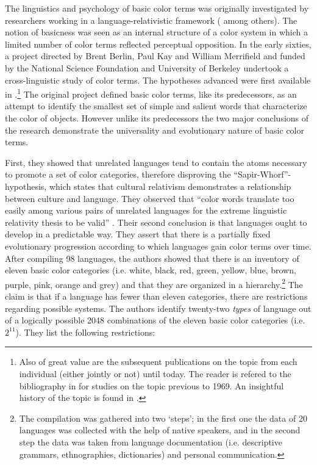 The linguistics and psychology of basic color terms was originally investigated
by researchers working in a  language-relativistic framework (\cite{Brow54,
Conk55}
among others). The notion of basicness was seen as an internal structure of a
color system in which a limited number of color terms reflected perceptual
opposition. In the early sixties, a project directed by Brent Berlin, Paul Kay
and William Merrifield and funded by the National Science Foundation and
University
of Berkeley undertook a cross-linguistic study of color terms. The
hypotheses advanced were first available in \cite{Berl69}.\footnote{Also of
great value are the subsequent publications on the topic  from each individual
(either jointly or not) until today. The reader is refered to the bibliography
in
\cite{Berl69} for studies on the topic previous to 1969.  An insightful
history of the topic is found  in
\cite{Saun00}.} The original project
 defined basic color terms, like its predecessors, as an attempt to identify the
smallest set
of simple and salient words that characterize the color of objects. However unlike its predecessors  the two
major conclusions of the research demonstrate the universality and evolutionary
nature of    basic color terms. 

First, they showed that  unrelated languages tend to contain the atoms necessary
to promote a set of color categories, therefore disproving the
``Sapir-Whorf''-hypothesis, which states that cultural relativism 
demonstrates a
relationship between culture and language. They observed that ``color words
translate too easily among various pairs of unrelated languages for the extreme
linguistic relativity thesis to be valid'' \cite[2]{Berl69}. Their second
conclusion is that languages ought to develop in a predictable way. They assert
that there is a partially fixed evolutionary
progression according to which languages gain color terms over time. After
compiling 98 languages, the authors showed that there is an  inventory of eleven
basic color categories (i.e. white, black, red, green, yellow, blue, brown,
purple, pink, orange and grey) and that they are organized in a
hierarchy.\footnote{The compilation was gathered into two `steps'; in the first
one the data of 20 languages was collected with the help of native speakers, and
in the second step the data was taken from language documentation (i.e.
descriptive grammars, ethnographies, dictionaries) and personal communication.} 
The claim is that  if a language has fewer than eleven categories, there are
restrictions regarding possible systems. The authors identify twenty-two {\it
types} of language out of a logically possible 2048 combinations of the eleven
basic color categories (i.e. $2^{11}$).  They list the following restrictions:

